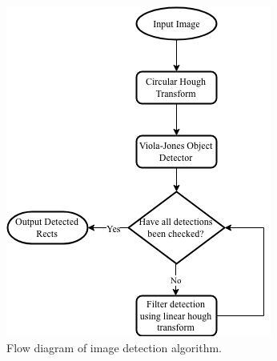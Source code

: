 \documentclass[conference]{IEEEtran}
\begin{document}
\begin{figure}[htbp]
\begin{center}
\includegraphics[width=0.8\linewidth]{images/flowdiagram.png}
\caption{Flow diagram of image detection algorithm. }
\label{default}
\end{center}
\end{figure}
\end{document}
